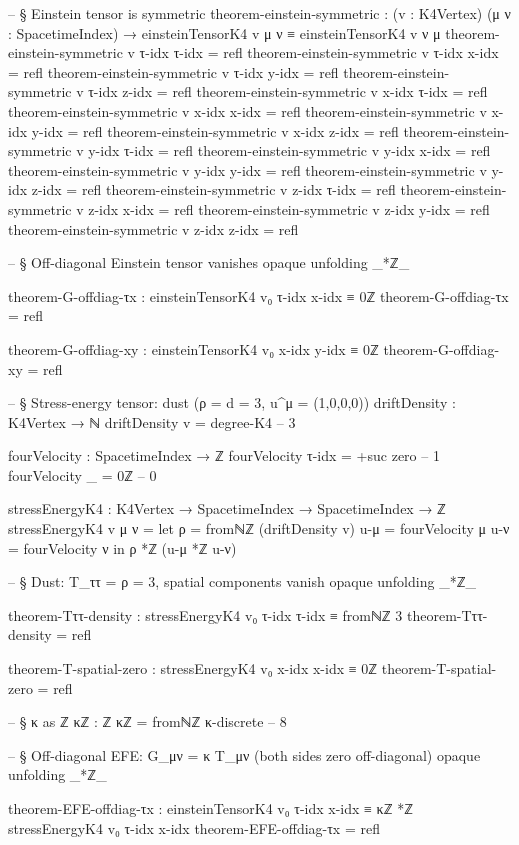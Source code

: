 \documentclass[11pt,a4paper]{book}
\begin{document}
\begin{code}
-- § Einstein tensor is symmetric
theorem-einstein-symmetric : (v : K4Vertex) (μ ν : SpacetimeIndex) →
  einsteinTensorK4 v μ ν ≡ einsteinTensorK4 v ν μ
theorem-einstein-symmetric v τ-idx τ-idx = refl
theorem-einstein-symmetric v τ-idx x-idx = refl
theorem-einstein-symmetric v τ-idx y-idx = refl
theorem-einstein-symmetric v τ-idx z-idx = refl
theorem-einstein-symmetric v x-idx τ-idx = refl
theorem-einstein-symmetric v x-idx x-idx = refl
theorem-einstein-symmetric v x-idx y-idx = refl
theorem-einstein-symmetric v x-idx z-idx = refl
theorem-einstein-symmetric v y-idx τ-idx = refl
theorem-einstein-symmetric v y-idx x-idx = refl
theorem-einstein-symmetric v y-idx y-idx = refl
theorem-einstein-symmetric v y-idx z-idx = refl
theorem-einstein-symmetric v z-idx τ-idx = refl
theorem-einstein-symmetric v z-idx x-idx = refl
theorem-einstein-symmetric v z-idx y-idx = refl
theorem-einstein-symmetric v z-idx z-idx = refl

-- § Off-diagonal Einstein tensor vanishes
opaque
  unfolding _*ℤ_

  theorem-G-offdiag-τx : einsteinTensorK4 v₀ τ-idx x-idx ≡ 0ℤ
  theorem-G-offdiag-τx = refl

  theorem-G-offdiag-xy : einsteinTensorK4 v₀ x-idx y-idx ≡ 0ℤ
  theorem-G-offdiag-xy = refl

-- § Stress-energy tensor: dust (ρ = d = 3, u^μ = (1,0,0,0))
driftDensity : K4Vertex → ℕ
driftDensity v = degree-K4  -- 3

fourVelocity : SpacetimeIndex → ℤ
fourVelocity τ-idx = +suc zero  -- 1
fourVelocity _     = 0ℤ         -- 0

stressEnergyK4 : K4Vertex → SpacetimeIndex → SpacetimeIndex → ℤ
stressEnergyK4 v μ ν =
  let ρ   = fromℕℤ (driftDensity v)
      u-μ = fourVelocity μ
      u-ν = fourVelocity ν
  in ρ *ℤ (u-μ *ℤ u-ν)

-- § Dust: T_ττ = ρ = 3, spatial components vanish
opaque
  unfolding _*ℤ_

  theorem-Tττ-density : stressEnergyK4 v₀ τ-idx τ-idx ≡ fromℕℤ 3
  theorem-Tττ-density = refl

  theorem-T-spatial-zero : stressEnergyK4 v₀ x-idx x-idx ≡ 0ℤ
  theorem-T-spatial-zero = refl

-- § κ as ℤ
κℤ : ℤ
κℤ = fromℕℤ κ-discrete  -- 8

-- § Off-diagonal EFE: G_μν = κ T_μν (both sides zero off-diagonal)
opaque
  unfolding _*ℤ_

  theorem-EFE-offdiag-τx : einsteinTensorK4 v₀ τ-idx x-idx ≡ κℤ *ℤ stressEnergyK4 v₀ τ-idx x-idx
  theorem-EFE-offdiag-τx = refl


\end{code}
\end{document}
